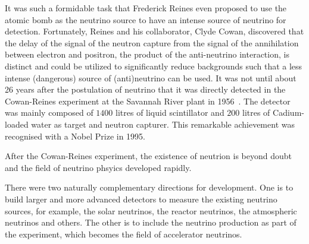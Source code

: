 It was such a formidable task that Frederick Reines even proposed to use the atomic bomb  as the neutrino source to have an intense source of neutrino for detection.
Fortunately, Reines and his collaborator, Clyde Cowan, discovered that the delay of the signal of the neutron capture from the signal of the annihilation between electron and positron, the product of the anti-neutrino interaction, is distinct and could be utilized to significantly reduce backgrounds such that a less intense (dangerous) source of (anti)neutrino can be used.
It was not until about 26 years after the postulation of neutrino that it was directly detected in the Cowan-Reines experiment at the Savannah River plant in 1956~\cite{Cowan:1956rrn}. 
The detector was mainly composed of $1400$ litres of liquid scintillator and $200$ litres of Cadium-loaded water as target and neutron capturer.
This remarkable achievement was recognised with a Nobel Prize in 1995.

After the Cowan-Reines experiment, the existence of neutrion is beyond doubt and the field of neutrino phsyics developed rapidly. 

There were two naturally complementary directions for development.
One is to build larger and more advanced detectors to measure the existing neutrino sources, for example, the solar neutrinos, the reactor neutrinos, the atmospheric neutrinos and others.
The other is to include the neutrino production as part of the experiment, which becomes the field of accelerator neutrinos.

